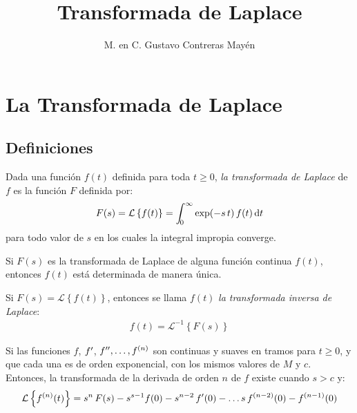 
\title{Transformada de Laplace} \vspace{-3ex}
\author{M. en C. Gustavo Contreras Mayén}
\date{ }
\newcommand{\Cancel}[2][black]{{\color{#1}\cancel{\color{black}#2}}}

\vspace{-4cm}
\maketitle
\fontsize{14}{14}\selectfont
\tableofcontents
\newpage


\section{La Transformada de Laplace}
\subsection{Definiciones}

Dada una función $f(t)$ definida para toda $t \geq 0$, \emph{la transformada de Laplace} de $f$ es la función $F$ definida por:
\begin{align*}
F(s) = \mathcal{L} \left\{ f(t) \right\} = \scaleint{5ex}_{\bs 0}^{\infty} \exp(-s \, t) \, f(t) \dd{t}
\end{align*}
para todo valor de $s$ en los cuales la integral impropia converge.
\par
Si $F(s)$ es la transformada de Laplace de alguna función continua $f(t)$,  entonces $f(t)$ está determinada de manera única.
\par
Si $F(s) = \mathcal{L} \left\{ f(t) \right\}$, entonces se llama $f(t)$ \emph{la transformada inversa de Laplace}:
\begin{align*}
f(t) = \mathcal{L}^{-1} \left\{ F(s) \right\}
\end{align*}

Si las funciones $f$, ${f}^{\prime}$, ${f}^{\prime \prime}, \ldots, {f}^{(n)}$ son continuas y suaves en tramos para $t \geq 0$, y que cada una es de orden exponencial, con los mismos valores de $M$ y $c$. Entonces, la transformada de la derivada de orden $n$ de $f$ existe cuando $s > c$ y:
\begin{align*}
\mathcal{L} \left\{ {f}^{(n)} (t) \right\} = s^{n} \, F(s) - s^{s-1} f(0) - s^{n-2} \, {f}^{\prime}(0) - \ldots s \, {f}^{(n-2)}(0) - {f}^{(n-1)}(0)
\end{align*}

